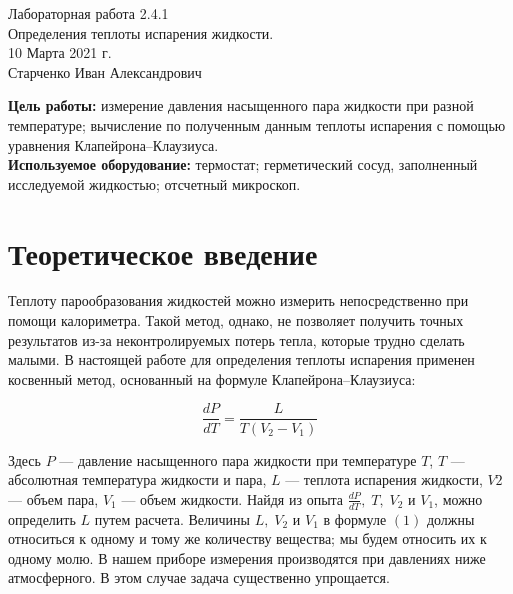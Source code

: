 




\setcounter{page}{1}

\begin{center}
  \LARGE{Лабораторная работа 2.4.1}\\[0.2cm]
  \LARGE{Определения теплоты испарения жидкости.}\\[0.2cm]
  \large{10 Марта 2021 г.}\\[0.2cm]
  \large{Старченко Иван Александрович}\\[0.2cm]
\end{center}



\textbf{Цель работы:} измерение давления насыщенного пара жидкости при разной температуре; вычисление по полученным данным теплоты испарения с помощью уравнения Клапейрона–Клаузиуса.\\

\textbf{Используемое оборудование:} термостат; герметический сосуд, заполненный исследуемой жидкостью; отсчетный микроскоп.

\section{Теоретическое введение}

Теплоту парообразования жидкостей можно измерить непосредственно при помощи калориметра. Такой метод, однако, не позволяет получить точных результатов из-за неконтролируемых потерь тепла, которые трудно сделать малыми. В настоящей работе для определения теплоты испарения применен
косвенный метод, основанный на формуле Клапейрона–Клаузиуса: 

\begin{equation}
	\frac{dP}
{dT} = \frac{L}{T(V_2 - V_1)}
\end{equation}

Здесь $P$ — давление насыщенного пара жидкости при температуре $T$, $T$ — абсолютная температура жидкости и пара, $L$ — теплота испарения жидкости, $V2$ — объем пара, $V_1$ — объем жидкости. Найдя из опыта $\frac{dP}{dT},\; T,\; V_2$ и $V_1$, можно определить $L$ путем расчета. Величины $L, \;V_2$ и $V_1$ в формуле $(1)$ должны относиться к одному и тому же количеству вещества; мы будем относить их к одному молю.
В нашем приборе измерения производятся при давлениях ниже атмосферного. В этом случае задача существенно упрощается.

